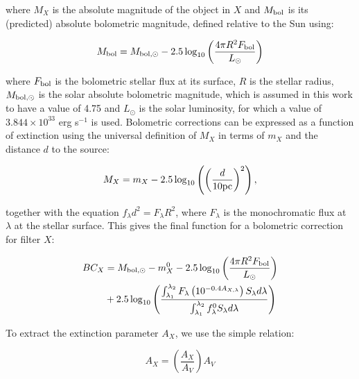 \documentclass[12pt, a4paper]{report}
\begin{document}
where $M_{X}$ is the absolute magnitude of the object in $X$ and $M_{\textnormal{bol}}$ is its (predicted) absolute bolometric magnitude, defined relative to the Sun using:

\begin{equation}
M_{\textnormal{bol}} = M_{\textnormal{bol},\odot} - 2.5 \log_{10} \left( \frac{4\pi R^{2}F_{\textnormal{bol}}}{L_{\odot}} \right)
\label{mbol_sun}
\end{equation}

where  $F_{\textnormal{bol}}$ is the bolometric stellar flux at its surface, $R$ is the stellar radius, $M_{\textnormal{bol},\odot}$ is the solar absolute bolometric magnitude, which is assumed in this work to have a value of 4.75 and $L_{\odot}$ is the solar luminosity, for which a value of $3.844 \times 10^{33}$ erg s$^{-1}$ is used. Bolometric corrections can be expressed as a function of extinction using the universal definition of $M_{X}$ in terms of $m_{X}$ and the distance $d$ to the source:

\begin{equation}
M_{X} = m_{X} - 2.5 \log_{10}\left( \left( \frac{d}{10 \textnormal{pc}} \right)^{2} \right),
\label{abs_mag_def}
\end{equation}

together with the equation $f_{\lambda}d^{2}=F_{\lambda}R^{2}$, where $F_{\lambda}$ is the monochromatic flux at $\lambda$ at the stellar surface. This gives the final function for a bolometric correction for filter $X$:

\begin{align}
\begin{split}
BC_{X} &= M_{\textnormal{bol},\odot} - m_{X}^{0} - 2.5 \log_{10} \left( \frac{4\pi R^{2}F_{\textnormal{bol}}}{L_{\odot}} \right) \\
&+ 2.5 \log_{10} \left( \frac{\int_{\lambda_{1}}^{\lambda_{2}} F_{\lambda} \left( 10^{-0.4 A_{X,\lambda}} \right) S_{\lambda} d\lambda}{\int_{\lambda_{1}}^{\lambda_{2}} f_{\lambda}^{0} S_{\lambda} d\lambda} \right)
\label{BC_extinc}
\end{split}
\end{align}


To extract the extinction parameter $A_{X}$, we use the simple relation:

\begin{equation}
A_{X} = \left( \frac{A_{X}}{A_{V}} \right) A_{V}
\label{ratio_eq}
\end{equation}
\end{document}
